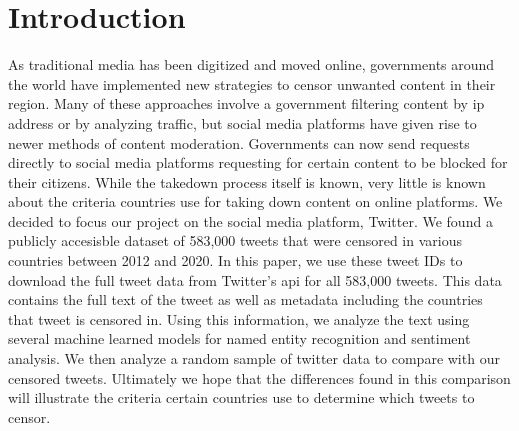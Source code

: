 \section{Introduction}\label{sec:intro}
As traditional media has been digitized and moved online, governments around the world have implemented new strategies to censor
unwanted content in their region. Many of these approaches involve a government filtering content by ip address or by analyzing traffic,
but social media platforms have given rise to newer methods of content moderation. Governments can now send requests directly to social media
platforms requesting for certain content to be blocked for their citizens. While the takedown process itself is known, very little is known about the criteria
countries use for taking down content on online platforms. We decided to focus our project on the social media platform, Twitter. We found a publicly accesisble
dataset of 583,000 tweets \cite{DBLP:journals/corr/abs-2101-05919} that were censored in various countries between 2012 and 2020. In this paper, we use these tweet IDs
to download the full tweet data from Twitter's api for all 583,000 tweets. This data contains the full text of the tweet as well as metadata including
the countries that tweet is censored in. Using this information, we analyze the text using several machine learned models for named entity recognition and sentiment analysis. We then analyze a random sample of twitter data to compare with our censored tweets. Ultimately we hope that the differences found in this comparison
will illustrate the criteria certain countries use to determine which tweets to censor.

